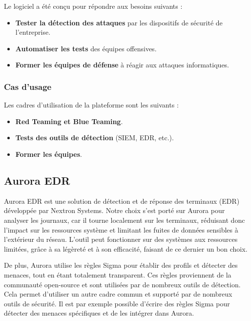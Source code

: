\documentclass[12pt,letterpaper]{article}
\begin{document}
Le logiciel a été conçu pour répondre aux besoins suivants :
\begin{itemize}
    \item \textbf{Tester la détection des attaques} par les dispositifs de sécurité de l'entreprise.
    \item \textbf{Automatiser les tests} des équipes offensives.
    \item \textbf{Former les équipes de défense} à réagir aux attaques informatiques.
\end{itemize}

\subsubsection{Cas d'usage}

Les cadres d'utilisation de la plateforme sont les suivants :
\begin{itemize}
    \item \textbf{Red Teaming et Blue Teaming}.
    \item \textbf{Tests des outils de détection} (SIEM, EDR, etc.).
    \item \textbf{Former les équipes}.
\end{itemize}

\subsection{Aurora EDR}

Aurora EDR est une solution de détection et de réponse des terminaux (EDR) développée par Nextron Systems.
Notre choix s'est porté sur Aurora pour analyser les journaux, car il tourne localement sur les terminaux, réduisant donc l'impact sur les ressources système et limitant les fuites de données sensibles à l'extérieur du réseau.
L'outil peut fonctionner sur des systèmes aux ressources limitées, grâce à sa légèreté et à son efficacité, faisant de ce dernier un bon choix.

\bigskip

De plus, Aurora utilise les règles Sigma pour établir des profils et détecter des menaces, tout en étant totalement transparent.
Ces règles proviennent de la communauté open-source et sont utilisées par de nombreux outils de détection.
Cela permet d'utiliser un autre cadre commun et supporté par de nombreux outils de sécurité.
Il est par exemple possible d'écrire des règles Sigma pour détecter des menaces spécifiques et de les intégrer dans Aurora.
\end{document}
